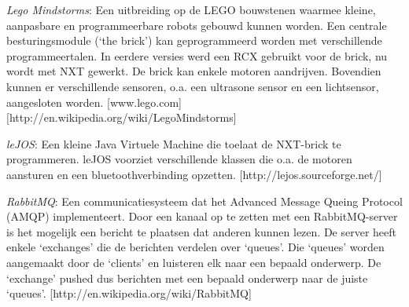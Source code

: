 \documentclass[tt1]{penoverslag}
\begin{document}
\newpage
\begin{thebibliography}{9}
\textit{Lego Mindstorms}:  Een uitbreiding op de LEGO bouwstenen waarmee kleine, aanpasbare en programmeerbare robots gebouwd kunnen worden. Een centrale besturingsmodule (`the brick') kan geprogrammeerd worden met verschillende programmeertalen. In eerdere versies werd een RCX gebruikt voor de brick, nu wordt met NXT gewerkt. De brick kan enkele motoren aandrijven. Bovendien kunnen er verschillende sensoren, o.a. een ultrasone sensor en een lichtsensor, aangesloten worden.  \mbox{[www.lego.com]} \mbox{[http://en.wikipedia.org/wiki/Lego\textendash Mindstorms]}

\textit{leJOS}: Een kleine Java Virtuele Machine die toelaat de NXT-brick te programmeren. leJOS voorziet verschillende klassen die o.a. de motoren aansturen en een bluetoothverbinding opzetten.  \mbox{[http://lejos.sourceforge.net/]}

\textit{RabbitMQ}: Een communicatiesysteem dat het Advanced Message Queing Protocol (AMQP) implementeert. Door een kanaal op te zetten met een RabbitMQ-server is het mogelijk een bericht te plaatsen dat anderen kunnen lezen. De server heeft enkele `exchanges' die de berichten verdelen over `queues'. Die `queues' worden aangemaakt door de `clients' en luisteren elk naar een bepaald onderwerp. De `exchange' pushed dus berichten met een bepaald onderwerp naar de juiste `queues'.
\mbox{[http://en.wikipedia.org/wiki/RabbitMQ]}


\end{thebibliography}
\end{document}
